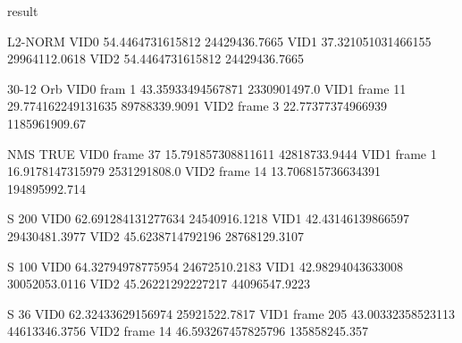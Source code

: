 result

L2-NORM
	VID0
	54.4464731615812
	24429436.7665
	VID1
	37.321051031466155
	29964112.0618
	VID2
	54.4464731615812
	24429436.7665

30-12 Orb
	VID0 fram 1
	43.35933494567871
	2330901497.0
	VID1 frame 11
	29.774162249131635
	89788339.9091
	VID2 frame 3
	22.77377374966939
	1185961909.67

NMS TRUE
	VID0 frame 37
	15.791857308811611
	42818733.9444
	VID1 frame 1
	16.9178147315979
	2531291808.0
	VID2 frame 14
	13.706815736634391
	194895992.714

S 200
	VID0
	62.691284131277634
	24540916.1218
	VID1
	42.43146139866597
	29430481.3977
	VID2
	45.6238714792196
	28768129.3107

S 100
	VID0
	64.32794978775954
	24672510.2183
	VID1
	42.98294043633008
	30052053.0116
	VID2
	45.26221292227217
	44096547.9223


S 36
	VID0
	62.32433629156974
	25921522.7817
	VID1 frame 205
	43.00332358523113
	44613346.3756
	VID2 frame 14
	46.593267457825796
	135858245.357
